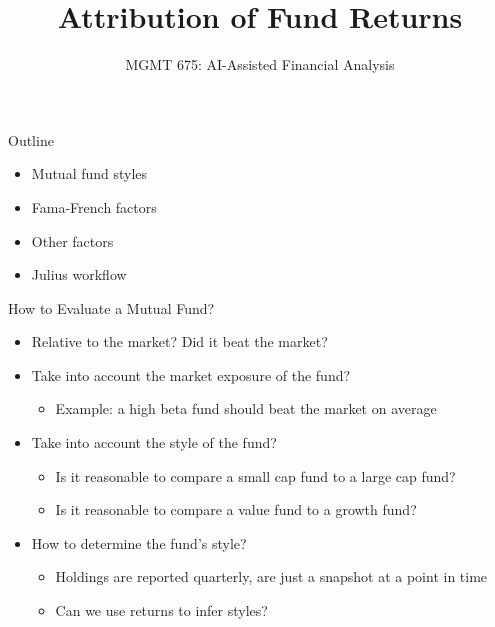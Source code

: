 \documentclass[10pt]{beamer}
\title{Attribution of Fund Returns}
\subtitle{MGMT 675: AI-Assisted Financial Analysis}
\date{}
\begin{document}
\begin{frame}[plain]
\titlepage
\end{frame}

\begin{frame}{Outline}
\begin{itemize}
\item Mutual fund styles
\item Fama-French factors
\item Other factors
\item Julius workflow
\end{itemize}
\end{frame}

\begin{frame}{How to Evaluate a Mutual Fund?}
\begin{itemize}
\item Relative to the market?  Did it beat the market?
\item \pause Take into account the market exposure of the fund?  
\begin{itemize}
\item Example: a high beta fund should beat the market on average
\end{itemize}
\item Take into account the style of the fund?
\begin{itemize}
\item Is it reasonable to compare a small cap fund to a large cap fund?
\item Is it reasonable to compare a value fund to a growth fund?
\end{itemize}
\item \pause How to determine the fund's style?
\begin{itemize}
\item Holdings are reported quarterly, are just a snapshot at a point in time
\item Can we use returns to infer styles?
\end{itemize}
\end{itemize}
\end{frame}
\end{document}
